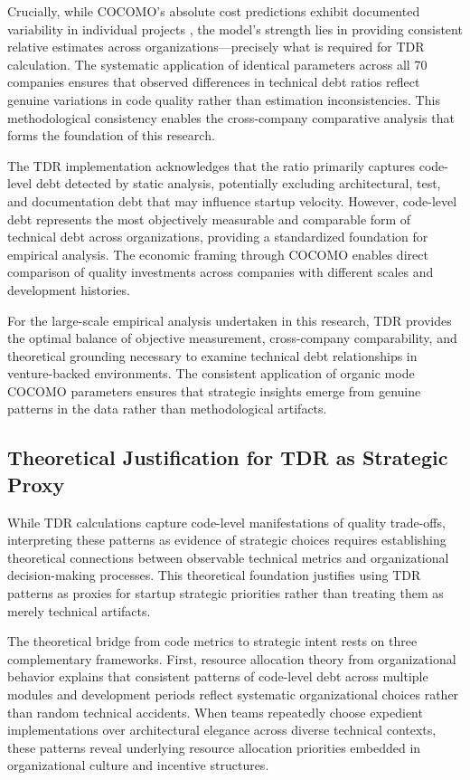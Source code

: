 Crucially, while \ac{COCOMO}'s absolute cost predictions exhibit documented variability in individual projects \citep{jeklin2025evaluation}, the model's strength lies in providing consistent relative estimates across organizations—precisely what is required for \ac{TDR} calculation. The systematic application of identical parameters across all 70 companies ensures that observed differences in technical debt ratios reflect genuine variations in code quality rather than estimation inconsistencies. This methodological consistency enables the cross-company comparative analysis that forms the foundation of this research.

The \ac{TDR} implementation acknowledges that the ratio primarily captures code-level debt detected by static analysis, potentially excluding architectural, test, and documentation debt that may influence startup velocity. However, code-level debt represents the most objectively measurable and comparable form of technical debt across organizations, providing a standardized foundation for empirical analysis. The economic framing through \ac{COCOMO} enables direct comparison of quality investments across companies with different scales and development histories.

For the large-scale empirical analysis undertaken in this research, \ac{TDR} provides the optimal balance of objective measurement, cross-company comparability, and theoretical grounding necessary to examine technical debt relationships in venture-backed environments. The consistent application of organic mode \ac{COCOMO} parameters ensures that strategic insights emerge from genuine patterns in the data rather than methodological artifacts.


\subsection{Theoretical Justification for TDR as Strategic Proxy}

While \ac{TDR} calculations capture code-level manifestations of quality trade-offs, interpreting these patterns as evidence of strategic choices requires establishing theoretical connections between observable technical metrics and organizational decision-making processes. This theoretical foundation justifies using \ac{TDR} patterns as proxies for startup strategic priorities rather than treating them as merely technical artifacts.

The theoretical bridge from code metrics to strategic intent rests on three complementary frameworks. First, resource allocation theory from organizational behavior \citep{cyert1963behavioral} explains that consistent patterns of code-level debt across multiple modules and development periods reflect systematic organizational choices rather than random technical accidents. When teams repeatedly choose expedient implementations over architectural elegance across diverse technical contexts, these patterns reveal underlying resource allocation priorities embedded in organizational culture and incentive structures.

